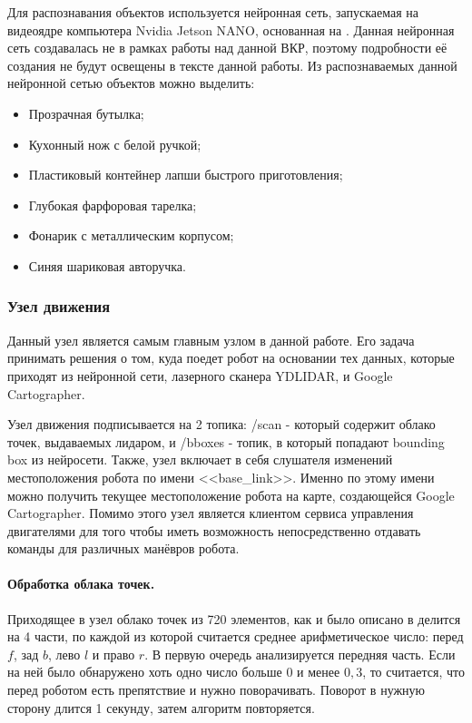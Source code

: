 Для распознавания объектов используется нейронная сеть, запускаемая на видеоядре компьютера Nvidia Jetson NANO, основанная на . Данная нейронная сеть создавалась не в рамках работы над данной ВКР, поэтому подробности её создания не будут освещены в тексте данной работы. Из распознаваемых данной нейронной сетью объектов можно выделить:

\begin{itemize}
\item Прозрачная бутылка;
\item Кухонный нож с белой ручкой;
\item Пластиковый контейнер лапши быстрого приготовления;
\item Глубокая фарфоровая тарелка;
\item Фонарик с металлическим корпусом;
\item Синяя шариковая авторучка.

\end{itemize} 

\subsubsection{Узел движения}
Данный узел является самым главным узлом в данной работе. Его задача принимать решения о том, куда поедет робот на основании тех данных, которые приходят из нейронной сети, лазерного сканера YDLIDAR, и Google Cartographer.

Узел движения подписывается на 2 топика: /scan - который содержит облако точек, выдаваемых лидаром, и /bboxes - топик, в который попадают bounding box из нейросети. Также, узел включает в себя слушателя изменений местоположения робота по имени <<base\_link>>. Именно по этому имени можно получить текущее местоположение робота на карте, создающейся Google Cartographer. Помимо этого узел является клиентом сервиса управления двигателями для того чтобы иметь возможность непосредственно отдавать команды для различных манёвров робота.

\paragraph{Обработка облака точек.} Приходящее в узел облако точек из 720 элементов, как и было описано в  делится на 4 части, по каждой из которой считается среднее арифметическое число: перед $f$, зад $b$, лево $l$ и право $r$. В первую очередь анализируется передняя часть. Если на ней было обнаружено хоть одно число больше $0$ и менее $0,3$, то считается, что перед роботом есть препятствие и нужно поворачивать. Поворот в нужную сторону длится 1 секунду, затем алгоритм повторяется.

